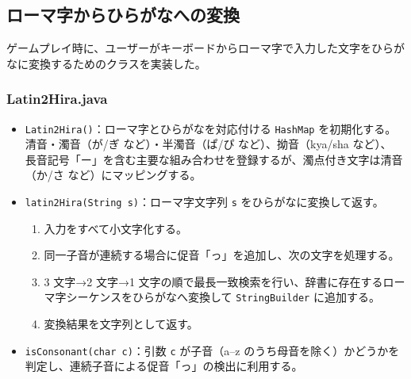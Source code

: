 \documentclass[a4j]{ujarticle}
\begin{document}
\subsection{ローマ字からひらがなへの変換}
ゲームプレイ時に、ユーザーがキーボードからローマ字で入力した文字をひらがなに変換するためのクラスを実装した。
\subsubsection{Latin2Hira.java}
\begin{itemize}
\item \texttt{Latin2Hira()}：ローマ字とひらがなを対応付ける \texttt{HashMap} を初期化する。
清音・濁音（が/ぎ など）・半濁音（ぱ/ぴ など）、拗音（kya/sha など）、
長音記号「ー」を含む主要な組み合わせを登録するが、濁点付き文字は清音（か/さ など）にマッピングする。  
\item \texttt{latin2Hira(String s)}：ローマ字文字列 \texttt{s} をひらがなに変換して返す。  
      \begin{enumerate}
        \item 入力をすべて小文字化する。  
        \item 同一子音が連続する場合に促音「っ」を追加し、次の文字を処理する。  
        \item 3 文字→2 文字→1 文字の順で最長一致検索を行い、辞書に存在するローマ字シーケンスをひらがなへ変換して \texttt{StringBuilder} に追加する。  
        \item 変換結果を文字列として返す。  
      \end{enumerate}
\item \texttt{isConsonant(char c)}：引数 \texttt{c} が子音（a--z のうち母音を除く）かどうかを判定し、連続子音による促音「っ」の検出に利用する。  
\end{itemize}
\end{document}
